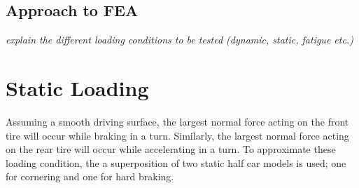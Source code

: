 \documentclass[12pt]{article}
\begin{document}
\subsection{Approach to FEA}
\textit{explain the different loading conditions to be tested (dynamic, static, fatigue etc.)}

\pagebreak
\section{Static Loading}
\label{sec:paramSelection}
Assuming a smooth driving surface, the largest normal force acting on the front tire will occur while braking in a turn. Similarly, the largest normal force acting on the rear tire will occur while accelerating in a turn. To approximate these loading condition, the a superposition of two static half car models is used; one for cornering and one for hard braking.  
\end{document}

